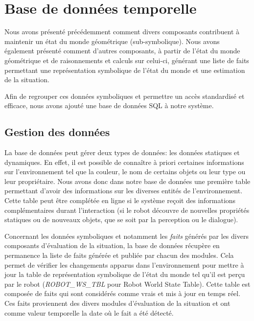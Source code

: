 \documentclass[a4paper,11pt,twoside]{StyleThese}
\begin{document}
\section{Base de données temporelle}
\label{sec:db}
Nous avons présenté précédemment comment divers composants contribuent à maintenir un état du monde géométrique (sub-symbolique). Nous avons également présenté comment d'autres composants, à partir de l'état du monde géométrique et de raisonnements et calculs sur celui-ci, générant une liste de faits permettant une représentation symbolique de l'état du monde et une estimation de la situation.

Afin de regrouper ces données symboliques et permettre un accès standardisé et efficace, nous avons ajouté une base de données SQL à notre système.

\subsection{Gestion des données}
\label{sec:dbd}
La base de données peut gérer deux types de données: les données statiques et dynamiques. En effet, il est possible de connaître à priori certaines informations sur l'environnement tel que la couleur, le nom de certains objets ou leur type ou leur propriétaire. 
Nous avons donc dans notre base de données une première table permettant d'avoir des informations sur les diverses entités de l'environnement. Cette table peut être complétée en ligne si le système reçoit des informations complémentaires durant l'interaction (si le robot découvre de nouvelles propriétés statiques ou de nouveaux objets, que se soit par la perception ou le dialogue).

Concernant les données symboliques et notamment les \textit{faits} générés par les divers composants d'évaluation de la situation, la base de données récupère en permanence la liste de faits générée et publiée par chacun des modules. Cela permet de vérifier les changements apparus dans l'environnement pour mettre à jour la table de représentation symbolique de l'état du monde tel qu'il est perçu par le robot (\textit{ROBOT\_WS\_TBL} pour Robot World State Table).
Cette table est composée de faits qui sont considérés comme vrais et mis à jour en temps réel. Ces faits proviennent des divers modules d'évaluation de la situation et ont comme valeur temporelle la date où le fait a été détecté.

\end{document}
